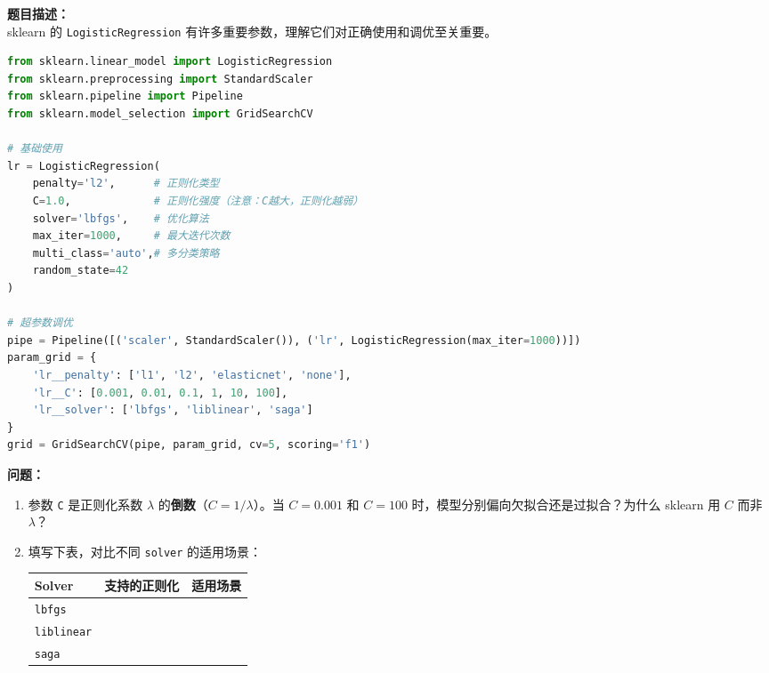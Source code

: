 \documentclass[a4paper,11pt]{ctexart}
\begin{document}
\begin{problembox}
    \textbf{题目描述：}\\
    sklearn 的 \texttt{LogisticRegression} 有许多重要参数，理解它们对正确使用和调优至关重要。

    \vspace{0.2cm}
    \begin{lstlisting}[language=Python]
from sklearn.linear_model import LogisticRegression
from sklearn.preprocessing import StandardScaler
from sklearn.pipeline import Pipeline
from sklearn.model_selection import GridSearchCV

# 基础使用
lr = LogisticRegression(
    penalty='l2',      # 正则化类型
    C=1.0,             # 正则化强度（注意：C越大，正则化越弱）
    solver='lbfgs',    # 优化算法
    max_iter=1000,     # 最大迭代次数
    multi_class='auto',# 多分类策略
    random_state=42
)

# 超参数调优
pipe = Pipeline([('scaler', StandardScaler()), ('lr', LogisticRegression(max_iter=1000))])
param_grid = {
    'lr__penalty': ['l1', 'l2', 'elasticnet', 'none'],
    'lr__C': [0.001, 0.01, 0.1, 1, 10, 100],
    'lr__solver': ['lbfgs', 'liblinear', 'saga']
}
grid = GridSearchCV(pipe, param_grid, cv=5, scoring='f1')
    \end{lstlisting}

    \vspace{0.2cm}
    \textbf{问题：}
    \begin{enumerate}[(1)]
        \item 参数 \texttt{C} 是正则化系数 $\lambda$ 的\textbf{倒数}（$C = 1/\lambda$）。当 $C=0.001$ 和 $C=100$ 时，模型分别偏向欠拟合还是过拟合？为什么 sklearn 用 $C$ 而非 $\lambda$？

        \item 填写下表，对比不同 \texttt{solver} 的适用场景：
        \begin{center}
        \begin{tabular}{p{2.5cm} p{3.5cm} p{5.5cm}}
            \toprule
            Solver & 支持的正则化 & 适用场景 \\
            \midrule
            \texttt{lbfgs} & \underline{\hspace{3cm}} & \underline{\hspace{5cm}} \\[1.2em]
            \texttt{liblinear} & \underline{\hspace{3cm}} & \underline{\hspace{5cm}} \\[1.2em]
            \texttt{saga} & \underline{\hspace{3cm}} & \underline{\hspace{5cm}} \\
            \bottomrule
        \end{tabular}
        \end{center}


\end{enumerate}
\end{problembox}
\end{document}
